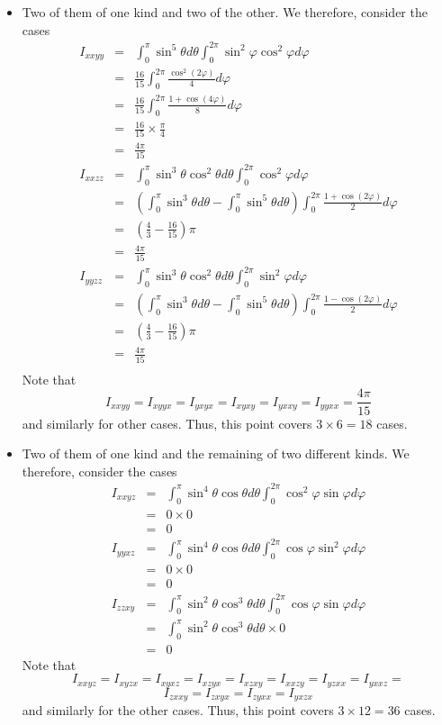 \begin{itemize}
\item Two of them of one kind and two of the other. We therefore, consider the cases
\begin{eqnarray*}
I_{xxyy} &=& \int_0^\pi\sin^5\theta d\theta \int_0^{2\pi}\sin^2\varphi\cos^2\varphi d\varphi \\
 &=& \frac{16}{15}\int_0^{2\pi}\frac{\cos^2(2\varphi)}{4}d\varphi \\
 &=& \frac{16}{15}\int_0^{2\pi}\frac{1 + \cos(4\varphi)}{8}d\varphi \\
 &=& \frac{16}{15}\times\frac{\pi}{4} \\
 &=& \frac{4\pi}{15} \\
I_{xxzz} &=& \int_0^\pi\sin^3\theta\cos^2\theta d\theta \int_0^{2\pi}\cos^2\varphi d\varphi \\
 &=& \left(\int_0^\pi\sin^3\theta d\theta - \int_0^\pi\sin^5\theta d\theta\right)\int_0^{2\pi}\frac{1 + \cos(2\varphi)}{2}d\varphi \\
 &=& \left(\frac{4}{3} - \frac{16}{15}\right)\pi \\
 &=& \frac{4\pi}{15} \\
I_{yyzz} &=& \int_0^\pi\sin^3\theta\cos^2\theta d\theta \int_0^{2\pi}\sin^2\varphi d\varphi \\
 &=& \left(\int_0^\pi\sin^3\theta d\theta - \int_0^\pi\sin^5\theta d\theta\right)\int_0^{2\pi}\frac{1 - \cos(2\varphi)}{2}d\varphi \\
 &=& \left(\frac{4}{3} - \frac{16}{15}\right)\pi \\
 &=& \frac{4\pi}{15} \\
\end{eqnarray*}
Note that
\[
I_{xxyy} = I_{xyyx} = I_{yxyx} = I_{xyxy} = I_{yxxy} = I_{yyxx} = \frac{4\pi}{15}
\]
and similarly for other cases. Thus, this point covers $3 \times 6 = 18$ cases.

\item Two of them of one kind and the remaining of two different kinds. We therefore, consider the cases
\begin{eqnarray*}
I_{xxyz} &=& \int_0^\pi\sin^4\theta \cos\theta d\theta \int_0^{2\pi}\cos^2\varphi \sin\varphi d\varphi \\
 &=& 0 \times 0 \\
 &=& 0 \\
I_{yyxz} &=& \int_0^\pi\sin^4\theta \cos\theta d\theta \int_0^{2\pi}\cos\varphi \sin^2\varphi d\varphi \\
 &=& 0 \times 0 \\
 &=& 0 \\
I_{zzxy} &=& \int_0^\pi\sin^2\theta \cos^3\theta d\theta \int_0^{2\pi}\cos\varphi\sin\varphi d\varphi \\
 &=& \int_0^\pi\sin^2\theta \cos^3\theta d\theta \times 0 \\
 &=& 0
\end{eqnarray*}
Note that
\[
I_{xxyz} = I_{xyzx} = I_{xyxz} = I_{xzyx} = I_{xzxy} = I_{xxzy} = I_{yzxx} = I_{yxxz} = 
\]
\[
I_{zxxy} = I_{zxyx} = I_{zyxx} = I_{yxzx}
\]
and similarly for the other cases. Thus, this point covers $3 \times 12 = 36$ cases.
\end{itemize}
